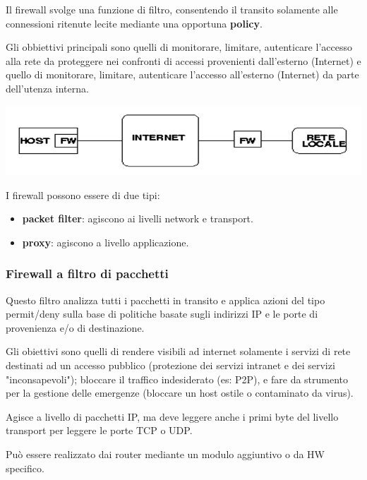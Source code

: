         Il firewall svolge una funzione di filtro, consentendo il transito solamente alle connessioni ritenute lecite mediante una opportuna \textbf{policy}.
    
        Gli obbiettivi principali sono quelli di monitorare, limitare, autenticare l'accesso alla rete da proteggere nei confronti di accessi provenienti dall'esterno (Internet) e quello di monitorare, limitare, autenticare l'accesso all'esterno (Internet) da parte dell'utenza interna.

        \begin{center}
            \includegraphics[scale=0.4]{chapters/7/assets/schema_b.png}
        \end{center}

        I firewall possono essere di due tipi:
        \begin{itemize}
            \item \textbf{packet filter}: agiscono ai livelli network e transport.
            \item \textbf{proxy}: agiscono a livello applicazione.
        \end{itemize}

        \subsubsection{Firewall a filtro di pacchetti}
            Questo filtro analizza tutti i pacchetti in transito e applica azioni del tipo permit/deny sulla base di politiche basate sugli indirizzi IP e le porte di provenienza e/o di destinazione.
        
            Gli obiettivi sono quelli di rendere visibili ad internet solamente i servizi di rete destinati ad un accesso pubblico (protezione dei servizi intranet e dei servizi "inconsapevoli"); bloccare il traffico indesiderato (es: P2P), e fare da strumento per la gestione delle emergenze (bloccare un host ostile o contaminato da virus).
        
            Agisce a livello di pacchetti IP, ma deve leggere anche i primi byte del livello transport per leggere le porte TCP o UDP.
        
            Può essere realizzato dai router mediante un modulo aggiuntivo o da HW specifico.
        
